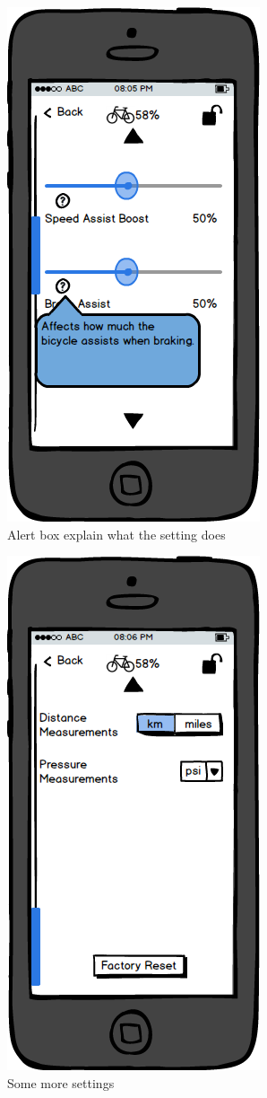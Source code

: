 \documentclass[a4paper]{report}
\begin{document}
\clearpage
\begin{figure}
\centering
\includegraphics[scale=0.9]{figures/prototype_2/settings_help_3}
\caption{Alert box explain what the setting does}
\end{figure}
\clearpage
\begin{figure}
\centering
\includegraphics[scale=0.9]{figures/prototype_2/settings_2}
\caption{Some more settings}
\end{figure}
\end{document}
